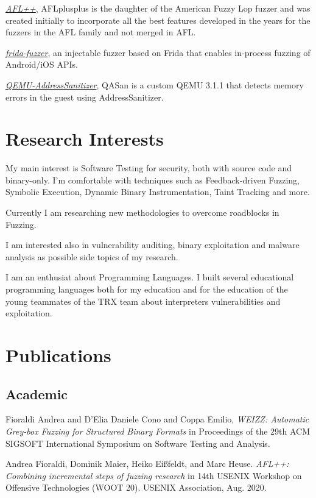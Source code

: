 \documentclass[10pt, a4paper]{article}
\newcommand{\years}[1]{\marginnote{\scriptsize #1}}
\begin{document}
\years{2019}\href{https://aflplus.plus}{\emph{AFL++}}, AFLplusplus is the daughter of the American Fuzzy Lop fuzzer and was created initially to incorporate all the best features developed in the years for the fuzzers in the AFL family and not merged in AFL.

\years{2019}\href{https://github.com/andreafioraldi/frida-fuzzer}{\emph{frida-fuzzer}}, an injectable fuzzer based on Frida that enables in-process fuzzing of Android/iOS APIs.

\years{2020}\href{https://github.com/andreafioraldi/qasan}{\emph{QEMU-AddressSanitizer}}, QASan is a custom QEMU 3.1.1 that detects memory errors in the guest using AddressSanitizer.

\section*{Research Interests}

My main interest is Software Testing for security, both with source code and binary-only.
I'm comfortable with techniques such as Feedback-driven Fuzzing, Symbolic Execution, Dynamic Binary Instrumentation,
Taint Tracking and more.

Currently I am researching new methodologies to overcome roadblocks in Fuzzing.

I am interested also in vulnerability auditing, binary exploitation and malware analysis as possible side topics of my research.

I am an enthusiat about Programming Languages.
I built several educational programming languages both for my education
and for the education of the young teammates of the TRX team about interpreters vulnerabilities and exploitation.

\section*{Publications}

\subsection*{Academic}

\noindent
\years{2020} Fioraldi Andrea and D'Elia Daniele Cono and Coppa Emilio, \textit{WEIZZ: Automatic Grey-box Fuzzing for Structured Binary Formats} in Proceedings of the 29th ACM SIGSOFT International Symposium on Software Testing and Analysis.

\noindent
\years{2020} Andrea Fioraldi, Dominik Maier, Heiko Eißfeldt, and Marc Heuse. \textit{AFL++: Combining incremental steps of fuzzing research} in 14th USENIX Workshop on Offensive Technologies (WOOT 20). USENIX Association, Aug. 2020.
\end{document}
